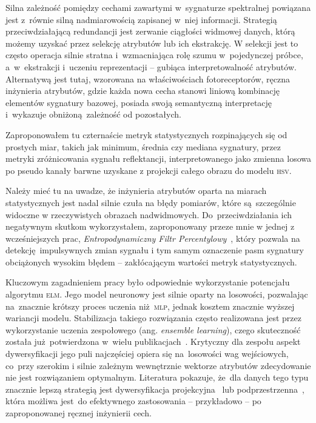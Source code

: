 Silna zależność pomiędzy cechami zawartymi w~sygnaturze spektralnej powiązana jest z~równie silną nadmiarowością zapisanej w~niej informacji. Strategią przeciwdziałającą redundancji jest zerwanie ciągłości widmowej danych, którą możemy uzyskać przez selekcję atrybutów lub ich ekstrakcję. W selekcji jest to często operacja silnie stratna i~wzmacniająca rolę szumu w~pojedynczej próbce, a~w~ekstrakcji i~uczeniu reprezentacji -- gubiąca interpretowalność atrybutów. Alternatywą jest tutaj, wzorowana na właściwościach fotoreceptorów, ręczna inżynieria atrybutów, gdzie każda nowa cecha stanowi liniową kombinację elementów sygnatury bazowej, posiada swoją semantyczną interpretację i~wykazuje obniżoną zależność od pozostałych.

Zaproponowałem tu czternaście metryk statystycznych rozpinających się od prostych miar, takich jak minimum, średnia czy mediana sygnatury, przez metryki zróżnicowania sygnału reflektancji, interpretowanego jako zmienna losowa po pseudo kanały barwne uzyskane z projekcji całego obrazu do modelu \textsc{hsv}.

Należy mieć tu na uwadze, że inżynieria atrybutów oparta na miarach statystycznych jest nadal silnie czuła na błędy pomiarów, które są szczególnie widoczne w rzeczywistych obrazach nadwidmowych. Do~przeciwdziałania ich negatywnym skutkom wykorzystałem, zaproponowany przeze mnie w jednej z wcześniejszych prac, \emph{Entropodynamiczny Filtr Percentylowy}~, który pozwala na detekcję impulsywnych zmian sygnału i tym samym oznaczenie pasm sygnatury obciążonych wysokim błędem -- zakłócającym wartości metryk statystycznych.

Kluczowym zagadnieniem pracy było odpowiednie wykorzystanie potencjału algorytmu \textsc{elm}. Jego model neuronowy jest silnie oparty na losowości, pozwalając na~znacznie krótszy proces uczenia niż \textsc{mlp}, jednak kosztem znacznie wyższej wariancji modelu. Stabilizacja takiego rozwiązania często realizowana jest przez wykorzystanie uczenia zespołowego (ang. \emph{ensemble learning}), czego skuteczność została już potwierdzona w~wielu publikacjach~. Krytyczny dla zespołu aspekt dywersyfikacji jego puli najczęściej opiera się na~losowości wag wejściowych, co~przy szerokim i silnie zależnym wewnętrznie wektorze atrybutów zdecydowanie nie jest rozwiązaniem optymalnym. Literatura pokazuje, że~dla danych tego typu znacznie lepszą strategią jest dywersyfikacja projekcyjna~ lub podprzestrzenna~, która możliwa jest~do efektywnego zastosowania -- przykładowo -- po zaproponowanej ręcznej inżynierii cech. 

